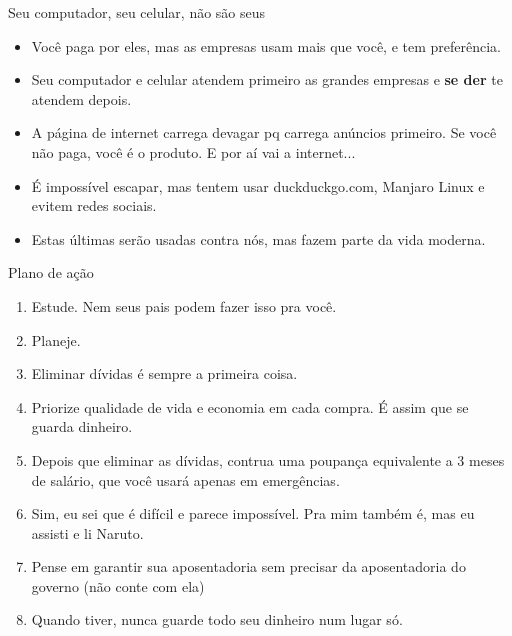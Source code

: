 \documentclass[]{beamer}
\begin{document}
\begin{frame}{Seu computador, seu celular, não são seus}

  \begin{itemize}
  \item Você paga por eles, mas as empresas usam mais que
    você, e tem preferência.
  \item Seu computador e celular atendem primeiro as grandes
    empresas e \textbf{se der} te atendem depois.
    \pause
  \item A página de internet carrega devagar pq carrega
    anúncios primeiro. Se você não paga, você é o produto. E
    por aí vai a internet...
  \item É impossível escapar, mas tentem usar
    duckduckgo.com, Manjaro Linux e evitem redes sociais.
    \pause
  \item  Estas últimas serão usadas contra nós, mas fazem parte
    da vida moderna.
  \end{itemize}

\end{frame}

  \begin{frame}{Plano de ação}

    \begin{enumerate}
    \item Estude. Nem seus pais podem fazer isso pra você. \pause
    \item Planeje.\pause
    \item Eliminar dívidas é sempre a primeira coisa.\pause
    \item Priorize qualidade de vida e economia em cada
      compra. É assim que se guarda dinheiro.\pause
    \item Depois que eliminar as dívidas, contrua uma
      poupança equivalente a 3 meses de salário, que você
      usará apenas em emergências.\pause
    \item Sim, eu sei que é difícil e parece impossível. Pra
      mim também é, mas eu assisti e li Naruto.\pause
    \item Pense em garantir sua aposentadoria sem precisar
      da aposentadoria do governo (não conte com ela)
    \item Quando tiver, nunca guarde todo seu dinheiro num
      lugar só.
    \end{enumerate}

   \end{frame} 
\end{document}

